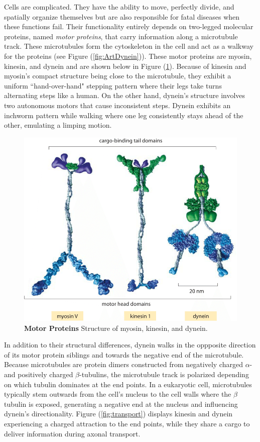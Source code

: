 Cells are complicated. They have the ability to move, perfectly divide, and spatially organize themselves but are also responsible for fatal diseases when these functions fail. Their functionality entirely depends on two-legged molecular proteins, named \textit{motor proteins}, that carry information along a microtubule track. These microtubules form the cytoskeleton in the cell and act as a walkway for the proteins (see Figure (\ref{fig:ArtDynein})). These motor proteins are myosin, kinesin, and dynein and are shown below in Figure (\ref{fig:Compare}). Because of kinesin and myosin's compact structure being close to the microtubule, they exhibit a uniform ``hand-over-hand" stepping pattern where their legs take turns alternating steps like a human. On the other hand, dynein's structure involves two autonomous motors that cause inconsistent steps. Dynein exhibits an inchworm pattern while walking where one leg consistently stays ahead of the other, emulating a limping motion.

\begin{figure}[H]
	\centering
	\includegraphics[width=0.4\columnwidth]{Figures/motor_comparison.png}
	\caption[Motor Proteins]{\textbf{Motor Proteins} Structure of myosin, kinesin, and dynein. \cite{JohnsonArt}}
	\label{fig:Compare}
\end{figure}

In addition to their structural differences, dynein walks in the oppposite direction of its motor protein siblings and towards the negative end of the microtubule. Because microtubules are protein dimers constructed from negatively charged $\alpha$- and positively charged $\beta$-tubulins, the microtubule track is polarized depending on which tubulin dominates at the end points. In a eukaryotic cell, microtubules typically stem outwards from the cell's nucleus to the cell walls where the $\beta$ tubulin is exposed, generating a negative end at the nucleus and influencing dynein's directionality. Figure (\ref{fig:transport}) displays kinesin and dynein experiencing a charged attraction to the end points, while they share a cargo to deliver information during axonal transport. 

